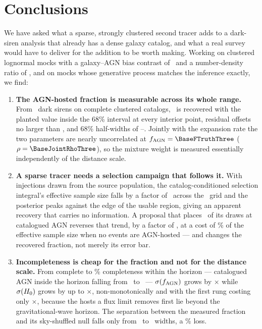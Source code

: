 \section{Conclusions}
\label{sec:conclusions}

We have asked what a sparse, strongly clustered second tracer adds to a
dark-siren analysis that already has a dense galaxy catalog, and what a real
survey would have to deliver for the addition to be worth making. Working on
clustered lognormal mocks with a galaxy--AGN bias contrast of \GlassBiasRatio\
and a number-density ratio of \GlassDensityRatio, and on mocks whose generative
process matches the inference exactly, we find:

\begin{enumerate}

\item \textbf{The AGN-hosted fraction is measurable across its whole range.}
From \GlassNobs\ dark sirens on complete clustered catalogs, \fagn\ is recovered
with the planted value inside the 68\% interval at every interior point,
residual offsets no larger than \BaseFOffMaxAbs, and 68\% half-widths of
\BaseFHwMin--\BaseFHwMax. Jointly with the expansion rate the two
parameters are nearly uncorrelated at $\fagn = \BaseFTruthThree$
($\rho = \BaseJointRhoThree$), so the mixture weight is measured essentially
independently of the distance scale.

\item \textbf{A sparse tracer needs a selection campaign that follows it.} With
injections drawn from the source population, the catalog-conditioned selection
integral's effective sample size falls by a factor of \NeffPopDecay\ across the
\fagn\ grid and the posterior peaks against the edge of the usable region, giving
an apparent recovery that carries no information. A proposal that places
\InjWtgt\ of its draws at catalogued AGN reverses that trend, by a factor of
\NeffTgtRise, at a cost of \NeffTgtCostAtZero\% of the effective sample size when
no events are AGN-hosted --- and changes the recovered fraction, not merely its
error bar.

\item \textbf{Incompleteness is cheap for the fraction and not for the distance
scale.} From complete to \IncMeighteenCPct\% completeness within the horizon ---
catalogued AGN inside the horizon falling from \IncCompleteAgnInHorizon\ to
\IncMeighteenAgnInHorizon\ --- $\sigma(f_{\rm AGN})$ grows by \IncFacFMax$\times$ while
$\sigma(H_0)$ grows by up to \IncFacHzeroMax$\times$, non-monotonically and
with the first rung costing only \IncFacHzeroFirst$\times$, because the
hosts a flux limit removes first lie beyond the gravitational-wave horizon. The
separation between the measured fraction and its sky-shuffled null falls only
from \IncCompleteSep\ to \IncMeighteenSep\ widths, a \IncSepLoss\% loss.


\end{enumerate}
